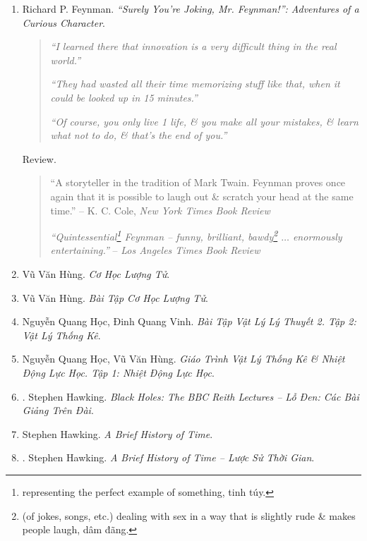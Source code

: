 \documentclass{article}
\begin{document}
\begin{enumerate}
	\item {\sc Richard P. Feynman}. {\it``Surely You're Joking, Mr. Feynman!'': Adventures of a Curious Character}.
	\begin{quotation}
		{\it``I learned there that innovation is a very difficult thing in the real world.''}
		
		{\it``They had wasted all their time memorizing stuff like that, when it could be looked up in 15 minutes.''}
		
		{\it``Of course, you only live 1 life, \& you make all your mistakes, \& learn what not to do, \& that's the end of you.''}
	\end{quotation}
	{\sf Review.}
	\begin{quotation}
		``A storyteller in the tradition of {\sc Mark Twain}. {\sf Feynman} proves once again that it is possible to laugh out \& scratch your head at the same time.'' -- K. C. Cole, {\it New York Times Book Review}
		
		{\it``Quintessential\footnote{representing the perfect example of something, tinh túy.} Feynman -- funny, brilliant, bawdy\footnote{(of jokes, songs, etc.) dealing with sex in a way that is slightly rude \& makes people laugh, dâm đãng.} $\ldots$ enormously entertaining.''} -- {\it Los Angeles Times Book Review}
	\end{quotation}	
	
	\item Vũ Văn Hùng. {\it Cơ Học Lượng Tử}.
	
	\item Vũ Văn Hùng. {\it Bài Tập Cơ Học Lượng Tử}.
	
	\item Nguyễn Quang Học, Đinh Quang Vinh. {\it Bài Tập Vật Lý Lý Thuyết 2. Tập 2: Vật Lý Thống Kê}.
	
	\item Nguyễn Quang Học, Vũ Văn Hùng. {\it Giáo Trình Vật Lý Thống Kê \& Nhiệt Động Lực Học. Tập 1: Nhiệt Động Lực Học}.
	
	\item \cite{Hawking_bbc}. Stephen Hawking. {\it Black Holes: The BBC Reith Lectures -- Lỗ Đen: Các Bài Giảng Trên Đài}.\hfill{\sf[done]}
	
	\item {\sc Stephen Hawking}. {\it A Brief History of Time}. {}
	
	\item \cite{Hawking_lstg}. {\sc Stephen Hawking}. {\it A Brief History of Time -- Lược Sử Thời Gian}.\hfill{\sf[done]}
	

\end{enumerate}
\end{document}
